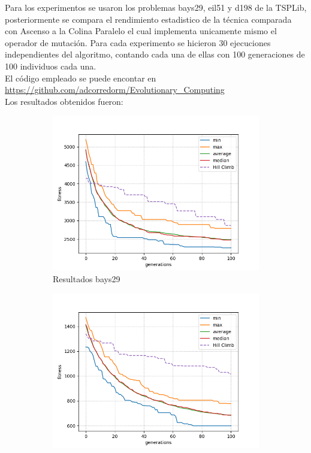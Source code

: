 \documentclass[twocolumn]{IEEEtran}
\begin{document}
Para los experimentos se usaron los problemas bays29, eil51 y d198 de la TSPLib,
posteriormente se compara el rendimiento estadistico de la técnica comparada con Ascenso a 
la Colina Paralelo el cual implementa unicamente mismo el operador de mutación.
Para cada experimento se hicieron 30 ejecuciones independientes del algoritmo, 
contando cada una de ellas con 100 generaciones de 100 individuos cada una.
\\
El código empleado se puede encontar en \url{https://github.com/adcorredorm/Evolutionary_Computing}
\\

Los resultados obtenidos fueron:

\begin{figure}
    \centering
    \begin{subfigure}[b]{1\linewidth}
        \includegraphics[width=\linewidth]{figures/tsp29.png}
        \caption{Resultados bays29}
    \end{subfigure}
    \begin{subfigure}[b]{1\linewidth}
        \includegraphics[width=\linewidth]{figures/tsp_51.png}

\end{subfigure}
\end{figure}
\end{document}
